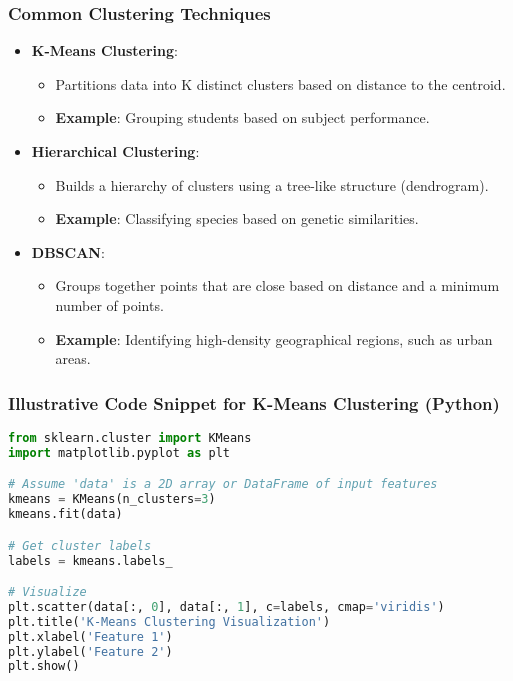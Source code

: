 \documentclass{beamer}
\begin{document}
\begin{frame}
    \frametitle{Common Clustering Techniques}
    \begin{itemize}
        \item \textbf{K-Means Clustering}:
            \begin{itemize}
                \item Partitions data into K distinct clusters based on distance to the centroid.
                \item \textbf{Example}: Grouping students based on subject performance.
            \end{itemize}
        
        \item \textbf{Hierarchical Clustering}:
            \begin{itemize}
                \item Builds a hierarchy of clusters using a tree-like structure (dendrogram).
                \item \textbf{Example}: Classifying species based on genetic similarities.
            \end{itemize}
        
        \item \textbf{DBSCAN}:
            \begin{itemize}
                \item Groups together points that are close based on distance and a minimum number of points.
                \item \textbf{Example}: Identifying high-density geographical regions, such as urban areas.
            \end{itemize}
    \end{itemize}
\end{frame}

\begin{frame}[fragile]
    \frametitle{Illustrative Code Snippet for K-Means Clustering (Python)}
    \begin{lstlisting}[language=Python]
from sklearn.cluster import KMeans
import matplotlib.pyplot as plt

# Assume 'data' is a 2D array or DataFrame of input features
kmeans = KMeans(n_clusters=3)
kmeans.fit(data)

# Get cluster labels
labels = kmeans.labels_

# Visualize
plt.scatter(data[:, 0], data[:, 1], c=labels, cmap='viridis')
plt.title('K-Means Clustering Visualization')
plt.xlabel('Feature 1')
plt.ylabel('Feature 2')
plt.show()
    \end{lstlisting}
\end{frame}
\end{document}
